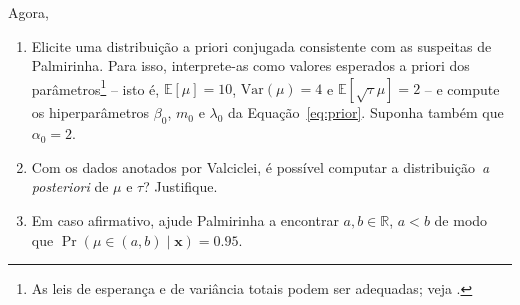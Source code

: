 \documentclass[a4paper,10pt, notitlepage]{report}
\begin{document}
\begin{enumerate}
Agora, 
\begin{enumerate}
	\item Elicite uma distribuição a priori conjugada consistente com as suspeitas de Palmirinha. Para isso, interprete-as como valores esperados a priori dos parâmetros\footnote{As leis de esperança e de variância totais podem ser adequadas; veja \cite[Seção 9.6]{Blitzstein2019-qi}.}  -- isto é, $\mathbb{E}[\mu] = 10$, $\mathrm{Var}(\mu) = 4$ e $\mathbb{E}[\sqrt{\tau} \mu] = 2$ -- e compute os hiperparâmetros $\beta_{0}$, $m_{0}$ e $\lambda_{0}$ da Equação~\eqref{eq:prior}. Suponha também que $\alpha_{0} = 2$.
	\item Com os dados anotados por Valciclei, é possível computar a distribuição~\textit{a posteriori} de $\mu$ e $\tau$? Justifique.
 \item Em caso afirmativo, ajude Palmirinha a encontrar $a, b \in \mathbb{R}$, $a < b$ de modo que $\operatorname{Pr}(\mu \in (a, b) \mid \boldsymbol{x}) = 0.95$.
\end{enumerate}

    
\end{enumerate}





\end{document}
